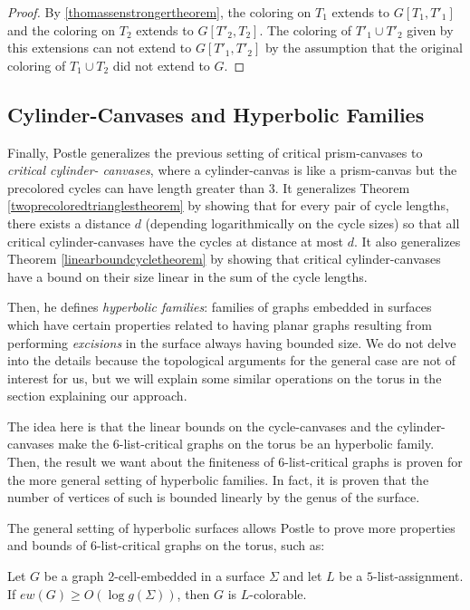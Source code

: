 \begin{proof}
	By \ref{thomassenstrongertheorem}, the coloring on $T_1$ extends to 
	$G[T_1, T'_1]$ and the coloring on $T_2$ extends to $G[T'_2, T_2]$. 
	The coloring of $T'_1 \cup T'_2$ given by this extensions can not 
	extend to $G[T'_1, T'_2]$ by the assumption that the original coloring 
	of $T_1 \cup T_2$ did not extend to $G$.
\end{proof}

\subsection{Cylinder-Canvases and Hyperbolic Families}

Finally, Postle generalizes the previous setting of critical prism-canvases to \emph{critical cylinder-
canvases}, where a cylinder-canvas is like a prism-canvas but the precolored cycles can have length
greater than $3$. It generalizes Theorem \ref{twoprecoloredtrianglestheorem} by showing that for
every pair of cycle lengths, there exists a distance $d$ (depending logarithmically on the cycle sizes)
so that all critical cylinder-canvases have the cycles at distance at most $d$. It also generalizes
Theorem \ref{linearboundcycletheorem} by showing that critical cylinder-canvases have a bound
on their size linear in the sum of the cycle lengths.

Then, he defines \emph{hyperbolic families}: families of graphs embedded in surfaces which have
certain properties related to having planar graphs resulting from performing \emph{excisions} in
the surface always having bounded size. We do not delve into the details because the topological
arguments for the general case are not of interest for us, but we will explain some similar
operations on the torus in the section explaining our approach. 

The idea here is that the linear bounds on the cycle-canvases and the cylinder-canvases make the 
$6$-list-critical graphs on the torus be an hyperbolic family. Then, the result we want about
the finiteness of $6$-list-critical graphs is proven for the more general setting of hyperbolic
families. In fact, it is proven that the number of vertices of such is bounded linearly by the genus 
of the surface.

The general setting of hyperbolic surfaces allows Postle to prove more properties and bounds of
$6$-list-critical graphs on the torus, such as:

\begin{theorem}
\label{edgewidththeorem}
Let $G$ be a graph 2-cell-embedded in a surface $\Sigma$ and let $L$ be a $5$-list-assignment.
If $ew(G) \geq O(\log g(\Sigma))$, then $G$ is $L$-colorable. 

\end{theorem}





